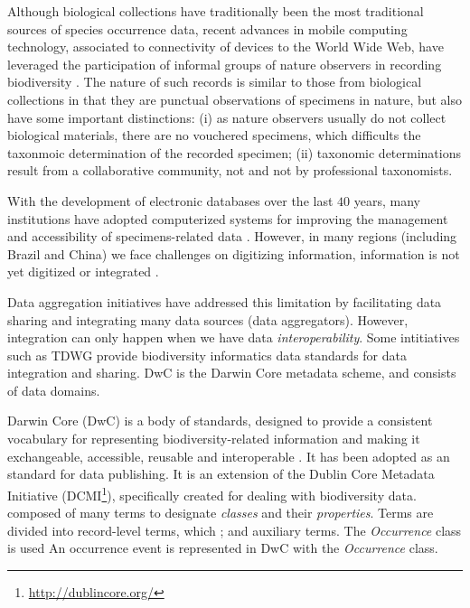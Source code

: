 Although biological collections have traditionally been the most traditional sources of species occurrence data, recent advances in mobile computing technology, associated to connectivity of devices to the World Wide Web, have leveraged the participation of informal groups of nature observers in recording biodiversity \cite{Silvertown2009}.
The nature of such records is similar to those from biological collections in that they are punctual observations of specimens in nature, but also have some important distinctions: (i) as nature observers usually do not collect biological materials, there are no vouchered specimens, which difficults the taxonmoic determination of the recorded specimen; (ii) taxonomic determinations result from a collaborative community, not and not by professional taxonomists. 

With the development of electronic databases over the last $40$ years, many institutions have adopted computerized systems for improving the management and accessibility of specimens-related data \cite{Sunderland2013}.
However, in many regions (including Brazil and China) we face challenges on digitizing information, information is not yet digitized or integrated \cite{Meyer2016}.




Data aggregation initiatives have addressed this limitation by facilitating data sharing and integrating many data sources (data aggregators). %
However, integration can only happen when we have data \textit{interoperability}.
Some intitiatives such as TDWG provide biodiversity informatics data standards for data integration and sharing.
DwC is the Darwin Core metadata scheme, and consists of data domains. %

Darwin Core (DwC) is a body of standards, designed to provide a consistent vocabulary for representing biodiversity-related information and making it exchangeable, accessible, reusable and interoperable \cite{Wieczorek2012}.
It has been adopted as an standard for data publishing.
It is an extension of the Dublin Core Metadata Initiative (DCMI\footnote{\url{http://dublincore.org/}}), specifically created for dealing with biodiversity data.
composed of many terms to designate \textit{classes} and their \textit{properties}.
Terms are divided into record-level terms, which ; and auxiliary terms.
The \textit{Occurrence} class is used
An occurrence event is represented in DwC with the \textit{Occurrence} class.






